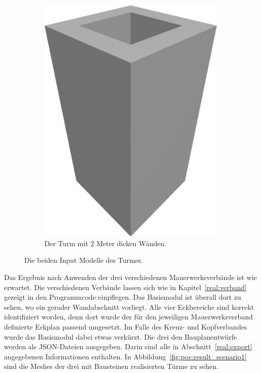 \begin{figure}[ht!]
\begin{subfigure}[b]{0.3\columnwidth}
    \includegraphics[width=\columnwidth]{fig/scenario1_render_base_thick.png}
    \caption{Der Turm mit 2 Meter dicken Wänden.}\label{fig:poc:scenario1_wall_thick}
  \end{subfigure}
  \hspace*{\fill}%
  \caption{Die beiden Input Modelle des Turmes.}\label{fig:poc:scenario1 modell}
\end{figure}

Das Ergebnis nach Anwenden der drei verschiedenen Mauerwerksverbände ist wie erwartet.
Die verschiedenen Verbände lassen sich wie in Kapitel~\ref{real:verband} gezeigt in den Programmcode einpflegen.
Das Basismodul ist überall dort zu sehen, wo ein gerader Wandabschnitt vorliegt.
Alle vier Eckbereiche sind korrekt identifiziert worden, denn dort wurde der für den jeweiligen Mauerwerksverband definierte Eckplan passend umgesetzt.
Im Falle des Kreuz- und Kopfverbandes wurde das Basismodul dabei etwas verkürzt.
Die drei den Bauplanentwürfe werden als JSON-Dateien ausgegeben.
Darin sind alle in Abschnitt~\ref{real:export} angegebenen Informationen enthalten.
In Abbildung~\ref{fig:poc:result_scenario1} sind die Meshes der drei mit Bausteinen realisierten Türme zu sehen.

